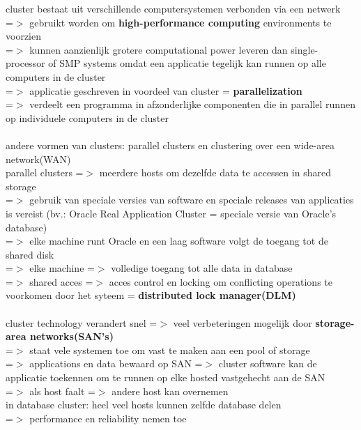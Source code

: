 \documentclass{report}
\begin{document}
cluster bestaat uit verschillende computersystemen verbonden via een netwerk
\\=$>$ gebruikt worden om \textbf{high-performance computing} environments te voorzien
\\=$>$ kunnen aanzienlijk grotere computational power leveren dan single-processor of SMP systems omdat een applicatie tegelijk kan runnen op alle computers in de cluster
\\=$>$ applicatie geschreven in voordeel van cluster = \textbf{parallelization}
\\=$>$ verdeelt een programma in afzonderlijke componenten die in parallel runnen op individuele computers in de cluster
\\
\\andere vormen van clusters: parallel clusters en clustering over een wide-area network(WAN)
\\parallel clusters =$>$ meerdere hosts om dezelfde data te accessen in shared storage
\\=$>$ gebruik van speciale versies van software en speciale releases van applicaties is vereist (bv.: Oracle Real Application Cluster = speciale versie van Oracle's database)
\\=$>$ elke machine runt Oracle en een laag software volgt de toegang tot de shared disk
\\=$>$ elke machine =$>$ volledige toegang tot alle data in database
\\=$>$ shared acces =$>$ acces control en locking om conflicting operations te voorkomen door het syteem = \textbf{distributed lock manager(DLM)} 
\\
\\cluster technology verandert snel =$>$ veel verbeteringen mogelijk door \textbf{storage-area networks(SAN's)} 
\\=$>$ staat vele systemen toe om vast te maken aan een pool of storage
\\=$>$ applications en data bewaard op SAN =$>$ cluster software kan de applicatie toekennen om te runnen op elke hosted vastgehecht aan de SAN
\\=$>$ als host faalt =$>$ andere host kan overnemen
\\in database cluster: heel veel hosts kunnen zelfde database delen
\\=$>$ performance en reliability nemen toe
\end{document}
